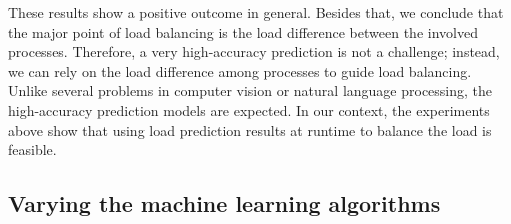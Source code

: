 These results show a positive outcome in general. Besides that, we conclude that the major point of load balancing is the load difference between the involved processes. Therefore, a very high-accuracy prediction is not a challenge; instead, we can rely on the load difference among processes to guide load balancing. Unlike several problems in computer vision or natural language processing, the high-accuracy prediction models are expected. In our context, the experiments above show that using load prediction results at runtime to balance the load is feasible.


\subsection{Varying the machine learning algorithms}
\label{subsec:exp_change_mlalgs}


